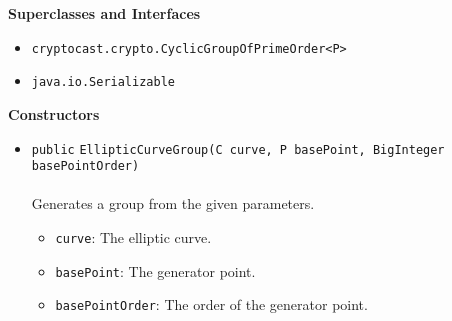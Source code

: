 \textbf{\sffamily Superclasses and Interfaces}
\begin{itemize}
\item \lstinline|cryptocast.crypto.CyclicGroupOfPrimeOrder<P>|
\item \lstinline|java.io.Serializable|
\end{itemize}


\textbf{\sffamily Constructors}
\begin{itemize}
\item \lstinline|public| \lstinline|EllipticCurveGroup|\lstinline|(C curve, P basePoint, BigInteger basePointOrder)|\\ \\[-0.6em]
Generates a group from the given parameters.
\begin{itemize}
\item \lstinline|curve|: The elliptic curve.
\item \lstinline|basePoint|: The generator point.
\item \lstinline|basePointOrder|: The order of the generator point.
\end{itemize}



\end{itemize}



